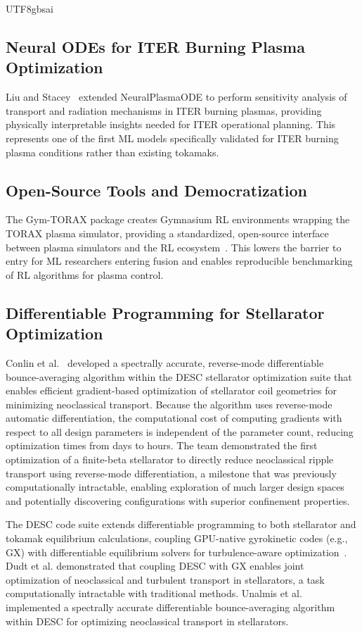 \documentclass[12pt,a4paper]{article}
\begin{document}
\begin{CJK}{UTF8}{gbsai}
\subsection{Neural ODEs for ITER Burning Plasma Optimization}

Liu and Stacey~\citep{Liu2025} extended NeuralPlasmaODE to perform sensitivity analysis of transport and radiation mechanisms in ITER burning plasmas, providing physically interpretable insights needed for ITER operational planning. This represents one of the first ML models specifically validated for ITER burning plasma conditions rather than existing tokamaks.

\subsection{Open-Source Tools and Democratization}

The Gym-TORAX package creates Gymnasium RL environments wrapping the TORAX plasma simulator, providing a standardized, open-source interface between plasma simulators and the RL ecosystem~\citep{Mouchamps2025}. This lowers the barrier to entry for ML researchers entering fusion and enables reproducible benchmarking of RL algorithms for plasma control.

\subsection{Differentiable Programming for Stellarator Optimization}

Conlin et al.~\citep{Conlin2024Nature} developed a spectrally accurate, reverse-mode differentiable bounce-averaging algorithm within the DESC stellarator optimization suite that enables efficient gradient-based optimization of stellarator coil geometries for minimizing neoclassical transport. Because the algorithm uses reverse-mode automatic differentiation, the computational cost of computing gradients with respect to all design parameters is independent of the parameter count, reducing optimization times from days to hours. The team demonstrated the first optimization of a finite-beta stellarator to directly reduce neoclassical ripple transport using reverse-mode differentiation, a milestone that was previously computationally intractable, enabling exploration of much larger design spaces and potentially discovering configurations with superior confinement properties.

The DESC code suite extends differentiable programming to both stellarator and tokamak equilibrium calculations, coupling GPU-native gyrokinetic codes (e.g., GX) with differentiable equilibrium solvers for turbulence-aware optimization~\citep{Dudt2024}. Dudt et al. demonstrated that coupling DESC with GX enables joint optimization of neoclassical and turbulent transport in stellarators, a task computationally intractable with traditional methods. Unalmis et al.~\citep{Unalmis2024} implemented a spectrally accurate differentiable bounce-averaging algorithm within DESC for optimizing neoclassical transport in stellarators.


\end{CJK}
\end{document}
